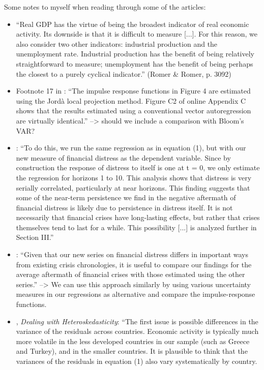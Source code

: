 \documentclass[a4paper,12pt,oneside,pointednumbers,bibtotoc,bigheadings,liststotoc]{scrbook}
\begin{document}
Some notes to myself when reading through some of the articles:
\begin{itemize}  
	\item ``Real GDP has the virtue of being the broadest indicator of real economic activity. Its downside is that it is difficult to measure [...]. For this reason, we also consider two other indicators: industrial production and the unemployment rate. Industrial production has the benefit of being relatively straightforward to measure; unemployment has the benefit of being perhaps the closest to a purely cyclical indicator.'' (Romer \& Romer, p. 3092)
	\item Footnote 17 in \citet{romandrom:17}: ``The impulse response functions in Figure 4 are estimated using the Jordà local projection method. Figure C2 of online Appendix C shows that the results estimated using a conventional vector autoregression are virtually identical.'' --> should we include a comparison with Bloom's VAR?
	\item \citet[p. 3096]{romandrom:17}: ``To do this, we run the same regression as in equation (1), but with our new measure of financial distress as the dependent variable. Since by construction the response of distress to itself is one at t = 0, we only estimate the regression for horizons 1 to 10. This analysis shows that distress is very serially correlated, particularly at near horizons. This finding suggests that some of the near-term persistence we find in the negative aftermath of financial distress is likely due to persistence in distress itself. It is not necessarily that financial crises have long-lasting effects, but rather that crises themselves tend to last for a while. This possibility [...] is analyzed further in Section III.''
	\item \citet[p. 3097]{romandrom:17}: ``Given that our new series on financial distress differs in important ways from existing crisis chronologies, it is useful to compare our findings for the average aftermath of financial crises with those estimated using the other series.'' --> We can use this approach similarly by using various uncertainty measures in our regressions as alternative and compare the impulse-response functions.
	\item \citet[p. 3099]{romandrom:17}, \textit{Dealing with Heteroskedasticity}: ``The first issue is possible differences in the variance of the residuals across countries. Economic activity is typically much more volatile in the less developed countries in our sample (such as Greece and Turkey), and in the smaller countries. It is plausible to think that the variances of the residuals in equation (1) also vary systematically by country. \\

\end{itemize}
\end{document}
